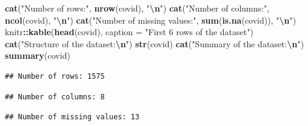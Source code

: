 \documentclass[
]{article}
\newenvironment{Shaded}{\begin{snugshade}}{\end{snugshade}}
\newcommand{\AttributeTok}[1]{\textcolor[rgb]{0.13,0.29,0.53}{#1}}
\newcommand{\FunctionTok}[1]{\textcolor[rgb]{0.13,0.29,0.53}{\textbf{#1}}}
\newcommand{\NormalTok}[1]{#1}
\newcommand{\SpecialCharTok}[1]{\textcolor[rgb]{0.81,0.36,0.00}{\textbf{#1}}}
\newcommand{\StringTok}[1]{\textcolor[rgb]{0.31,0.60,0.02}{#1}}
\begin{document}
\begin{Shaded}
\begin{Highlighting}[]
\FunctionTok{cat}\NormalTok{(}\StringTok{"Number of rows:"}\NormalTok{, }\FunctionTok{nrow}\NormalTok{(covid), }\StringTok{"}\SpecialCharTok{\textbackslash{}n}\StringTok{"}\NormalTok{)}
\FunctionTok{cat}\NormalTok{(}\StringTok{"Number of columns:"}\NormalTok{, }\FunctionTok{ncol}\NormalTok{(covid), }\StringTok{"}\SpecialCharTok{\textbackslash{}n}\StringTok{"}\NormalTok{)}
\FunctionTok{cat}\NormalTok{(}\StringTok{"Number of missing values:"}\NormalTok{, }\FunctionTok{sum}\NormalTok{(}\FunctionTok{is.na}\NormalTok{(covid)), }\StringTok{"}\SpecialCharTok{\textbackslash{}n}\StringTok{"}\NormalTok{)}
\NormalTok{knitr}\SpecialCharTok{::}\FunctionTok{kable}\NormalTok{(}\FunctionTok{head}\NormalTok{(covid), }\AttributeTok{caption =} \StringTok{"First 6 rows of the dataset"}\NormalTok{)}
\FunctionTok{cat}\NormalTok{(}\StringTok{"Structure of the dataset:}\SpecialCharTok{\textbackslash{}n}\StringTok{"}\NormalTok{)}
\FunctionTok{str}\NormalTok{(covid)}
\FunctionTok{cat}\NormalTok{(}\StringTok{"Summary of the dataset:}\SpecialCharTok{\textbackslash{}n}\StringTok{"}\NormalTok{)}
\FunctionTok{summary}\NormalTok{(covid)}
\end{Highlighting}
\end{Shaded}

\begin{verbatim}
## Number of rows: 1575
\end{verbatim}

\begin{verbatim}
## Number of columns: 8
\end{verbatim}

\begin{verbatim}
## Number of missing values: 13
\end{verbatim}
\end{document}
